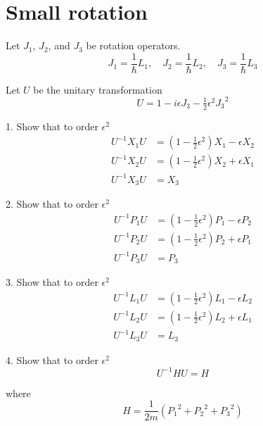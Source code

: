 

\section*{Small rotation}

Let $J_1$, $J_2$, and $J_3$ be rotation operators.
\begin{equation*}
J_1=\frac{1}{\hbar}L_1,\quad
J_2=\frac{1}{\hbar}L_2,\quad
J_3=\frac{1}{\hbar}L_3
\end{equation*}

Let $U$ be the unitary transformation
\begin{equation*}
U=1-i\epsilon J_3-\tfrac{1}{2}\epsilon^2{J_3}^2
\end{equation*}

1. Show that to order $\epsilon^2$
\begin{align*}
U^{-1}X_1U&=\left(1-\tfrac{1}{2}\epsilon^2\right)X_1-\epsilon X_2
\\
U^{-1}X_2U&=\left(1-\tfrac{1}{2}\epsilon^2\right)X_2+\epsilon X_1
\\
U^{-1}X_3U&=X_3
\end{align*}

2. Show that to order $\epsilon^2$
\begin{align*}
U^{-1}P_1U&=\left(1-\tfrac{1}{2}\epsilon^2\right)P_1-\epsilon P_2
\\
U^{-1}P_2U&=\left(1-\tfrac{1}{2}\epsilon^2\right)P_2+\epsilon P_1
\\
U^{-1}P_3U&=P_3
\end{align*}

3. Show that to order $\epsilon^2$
\begin{align*}
U^{-1}L_1U&=\left(1-\tfrac{1}{2}\epsilon^2\right)L_1-\epsilon L_2
\\
U^{-1}L_2U&=\left(1-\tfrac{1}{2}\epsilon^2\right)L_2+\epsilon L_1
\\
U^{-1}L_3U&=L_3
\end{align*}

4. Show that to order $\epsilon^2$
\begin{equation*}
U^{-1}HU=H
\end{equation*}

where
\begin{equation*}
H=\frac{1}{2m}\left({P_1}^2+{P_2}^2+{P_3}^2\right)
\end{equation*}


